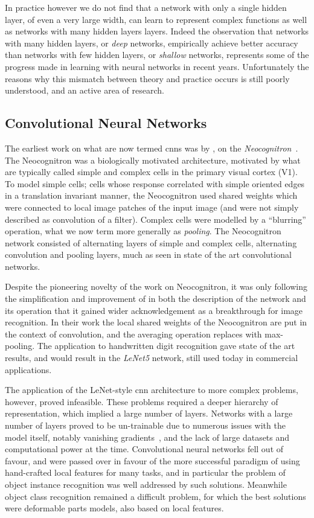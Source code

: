\documentclass[thesis]{subfiles}
\begin{document}
In practice however we do not find that a network with only a single hidden layer, of even a very large width, can learn to represent complex functions as well as networks with many hidden layers layers. Indeed the observation that networks with many hidden layers, or \emph{deep} networks, empirically achieve better accuracy than networks with few hidden layers, or \emph{shallow} networks, represents some of the progress made in learning with neural networks in recent years. Unfortunately the reasons why this mismatch between theory and practice occurs is still poorly understood, and an active area of research.

\subsection{Convolutional Neural Networks}\label{cnns}
The earliest work on what are now termed \glspl{cnn} was by \citet{Fuk80}, on the \emph{Neocognitron}~\citep{fukushima2013artificial}. The Neocognitron was a biologically motivated architecture, motivated by what are typically called simple and complex cells in the primary visual cortex (V1). To model simple cells; cells whose response correlated with simple oriented edges in a translation invariant manner, the Neocognitron used shared weights which were connected to local image patches of the input image (and were not simply described as convolution of a filter). Complex cells were modelled by a ``blurring'' operation, what we now term more generally as \emph{pooling}. The Neocognitron network consisted of alternating layers of simple and complex cells, \ie{}alternating convolution and pooling layers, much as seen in state of the art convolutional networks.

Despite the pioneering novelty of the work on Neocognitron, it was only following the simplification and improvement of \citet{Lecun1998} in both the description of the network and its operation that it gained wider acknowledgement as a breakthrough for image recognition. In their work the local shared weights of the Neocognitron are put in the context of convolution, and the averaging operation replaces with max-pooling. The application to handwritten digit recognition gave state of the art results, and would result in the \emph{LeNet5} network, still used today in commercial applications.

The application of the LeNet-style \gls{cnn} architecture to more complex problems, however, proved infeasible. These problems required a deeper hierarchy of representation, which implied a large number of layers. Networks with a large number of layers proved to be un-trainable due to numerous issues with the model itself, notably vanishing gradients~\citep{hochreiter1991untersuchungen}, and the lack of large datasets and computational power at the time. Convolutional neural networks fell out of favour, and were passed over in favour of the more successful paradigm of using hand-crafted local features for many tasks, and in particular the problem of object instance recognition was well addressed by such solutions. Meanwhile object class recognition remained a difficult problem, for which the best solutions were deformable parts models, also based on local features.
\end{document}
